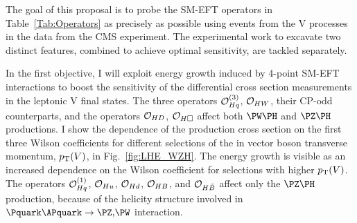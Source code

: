 \documentclass[a4paper,11pt]{article}
\renewcommand{\PV}{{{{V}}}\xspace}
\newcommand{\VH}{{{\PV}{\PH}}\xspace}
\begin{document}
The goal of this proposal is to probe the SM-EFT operators in Table~\ref{Tab:Operators}  as precisely as possible using events from the \VH processes in the data from the CMS experiment. 
The experimental work to excavate two distinct features, combined to achieve optimal sensitivity, are tackled separately.

In the first objective, I will exploit energy growth induced by 4-point SM-EFT interactions to boost the sensitivity of the differential cross section measurements in the leptonic \VH final states.
The three operators ${\cal O}^{(3)}_{Hq}$, ${\cal O}_{HW}$, their CP-odd counterparts, and the operators ${\cal O}_{HD}$, ${\cal O}_{H\square}$ affect both $\PW\PH$ and $\PZ\PH$ productions. 
I show the dependence of the production cross section on the first three Wilson coefficients for different selections of the in vector boson transverse momentum, $\pt(\PV)$, in Fig.~\ref{fig:LHE_WZH}. 
The energy growth is visible as an increased dependence on the Wilson coefficient for selections with higher $\pt(\PV)$. %
The operators ${\cal O}^{(1)}_{Hq}$, ${\cal O}_{Hu}$, ${\cal O}_{Hd}$, ${\cal O}_{HB}$, and ${\cal O}_{H\tilde{B}}$ affect only the $\PZ\PH$ production, because of the helicity structure involved in $\Pquark\APquark \to \PZ\text{,}\PW$ interaction. %
\end{document}
